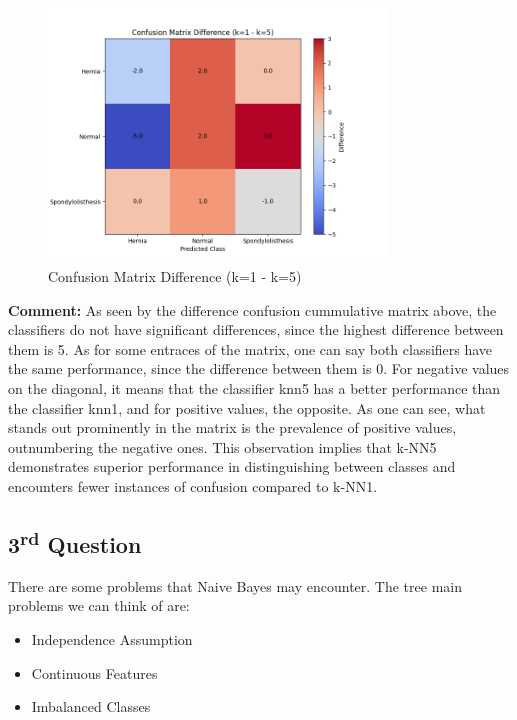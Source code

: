 \documentclass{article}
\begin{document}
\begin{figure}[H]
  \centering
  \includegraphics[width=0.8\textwidth]{images/confusion_matrix_difference.png}
  \caption{Confusion Matrix Difference (k=1 - k=5)}
  \label{fig:confusion_matrix_difference}
\end{figure}

\textbf{Comment:}
As seen by the difference confusion cummulative matrix above, the classifiers do not have significant differences, since the highest difference between them is 5. As for some entraces of the matrix, one can say both classifiers have the same performance, since the difference between them is 0. For negative values on the diagonal, it means that the classifier knn5 has a better performance than the classifier knn1, and for positive values, the opposite. As one can see, what stands out prominently in the matrix is the prevalence of positive values, outnumbering the negative ones. This observation implies that k-NN5 demonstrates superior performance in distinguishing between classes and encounters fewer instances of confusion compared to k-NN1.





\subsection*{3\textsuperscript{rd} Question}

There are some problems that Naive Bayes may encounter. The tree main problems we can think of are:
\begin{itemize}
  \item Independence Assumption
  \item Continuous Features
  \item Imbalanced Classes
\end{itemize}
\end{document}
